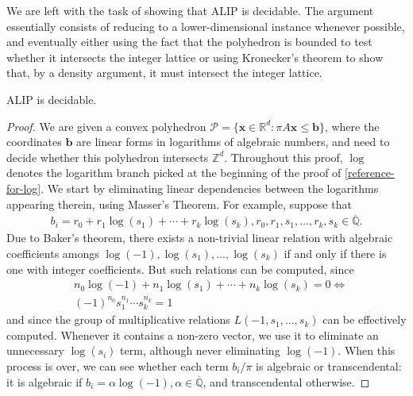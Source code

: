 We are left with the task of showing that ALIP is decidable. The argument essentially consists of reducing to a lower-dimensional instance whenever possible, and eventually either using the fact that the polyhedron is bounded to test whether it intersects the integer lattice or using Kronecker's theorem to show that, by a density argument, it must intersect the integer lattice.

\begin{theorem}
ALIP is decidable.
\end{theorem}

\begin{proof}
We are given a convex polyhedron $\mathcal{P}=\lbrace \boldsymbol{x} \in \mathbb{R}^{d} : \pi A \boldsymbol{x} \leq \boldsymbol{b} \rbrace$, where the coordinates $\boldsymbol{b}$ are linear forms in logarithms of algebraic numbers, and need to decide whether this polyhedron intersects $\mathbb{Z}^{d}$. Throughout this proof, $\log$ denotes the logarithm branch picked at the beginning of the proof of \cref{reference-for-log}. We start by eliminating linear dependencies between the logarithms appearing therein, using Masser's Theorem. For example, suppose that
\begin{align*}
b_{i} = r_{0} + r_{1} \log(s_{1}) + \cdots + r_{k} \log(s_{k}), r_{0}, r_{1}, s_{1}, \ldots, r_{k}, s_{k} \in \overline{\mathbb{Q}}.
\end{align*}
Due to Baker's theorem, there exists a non-trivial linear relation with algebraic coefficients amongs $\log(-1), \log(s_{1}), \ldots, \log(s_{k})$ if and only if there is one with integer coefficients. But such relations can be computed, since
\begin{align*}
&n_{0} \log(-1) + n_{1} \log(s_{1}) + \cdots + n_{k} \log(s_{k}) = 0 \Leftrightarrow \\
&(-1)^{n_{0}} s_{1}^{n_{1}} \cdots s_{k}^{n_{k}} = 1
\end{align*}
and since the group of multiplicative relations $L(-1, s_{1}, \ldots, s_{k})$ can be effectively computed. Whenever it contains a non-zero vector, we use it to eliminate an unnecessary $\log(s_{i})$ term, although never eliminating $\log(-1)$. When this process is over, we can see whether each term $b_{i}/\pi$ is algebraic or transcendental: it is algebraic if $b_{i} = \alpha \log(-1), \alpha \in \overline{\mathbb{Q}}$, and transcendental otherwise.


\end{proof}
